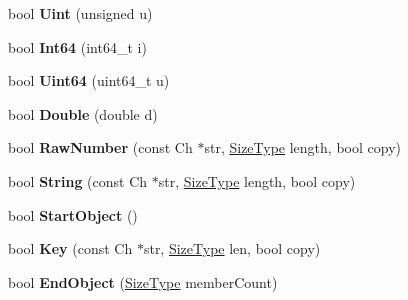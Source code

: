 \begin{DoxyCompactItemize}
\item 
bool {\bfseries Uint} (unsigned u)\hypertarget{classGenericSchemaValidator_aa688665c5274f93543c84a4b6cabe8da}{}\label{classGenericSchemaValidator_aa688665c5274f93543c84a4b6cabe8da}

\item 
bool {\bfseries Int64} (int64\+\_\+t i)\hypertarget{classGenericSchemaValidator_ac5a9e416e18129a7b787f251019a828f}{}\label{classGenericSchemaValidator_ac5a9e416e18129a7b787f251019a828f}

\item 
bool {\bfseries Uint64} (uint64\+\_\+t u)\hypertarget{classGenericSchemaValidator_abfc56c58cf0b65318e376fc5f2879292}{}\label{classGenericSchemaValidator_abfc56c58cf0b65318e376fc5f2879292}

\item 
bool {\bfseries Double} (double d)\hypertarget{classGenericSchemaValidator_aed0532dbda3ac6f3ca7196af06066b86}{}\label{classGenericSchemaValidator_aed0532dbda3ac6f3ca7196af06066b86}

\item 
bool {\bfseries Raw\+Number} (const Ch $\ast$str, \hyperlink{rapidjson_8h_a5ed6e6e67250fadbd041127e6386dcb5}{Size\+Type} length, bool copy)\hypertarget{classGenericSchemaValidator_ae4f024145421d2c1dde08a9de528722a}{}\label{classGenericSchemaValidator_ae4f024145421d2c1dde08a9de528722a}

\item 
bool {\bfseries String} (const Ch $\ast$str, \hyperlink{rapidjson_8h_a5ed6e6e67250fadbd041127e6386dcb5}{Size\+Type} length, bool copy)\hypertarget{classGenericSchemaValidator_a33cf3f83307a8fea38c3238ef75c3d58}{}\label{classGenericSchemaValidator_a33cf3f83307a8fea38c3238ef75c3d58}

\item 
bool {\bfseries Start\+Object} ()\hypertarget{classGenericSchemaValidator_a59972d612c3d37aae9a30222e428d216}{}\label{classGenericSchemaValidator_a59972d612c3d37aae9a30222e428d216}

\item 
bool {\bfseries Key} (const Ch $\ast$str, \hyperlink{rapidjson_8h_a5ed6e6e67250fadbd041127e6386dcb5}{Size\+Type} len, bool copy)\hypertarget{classGenericSchemaValidator_a6d08b458216ec4a09eed9d94800d05c1}{}\label{classGenericSchemaValidator_a6d08b458216ec4a09eed9d94800d05c1}

\item 
bool {\bfseries End\+Object} (\hyperlink{rapidjson_8h_a5ed6e6e67250fadbd041127e6386dcb5}{Size\+Type} member\+Count)\hypertarget{classGenericSchemaValidator_aa89e14f0f731f6acdec22a0f7e003037}{}\label{classGenericSchemaValidator_aa89e14f0f731f6acdec22a0f7e003037}


\end{DoxyCompactItemize}
